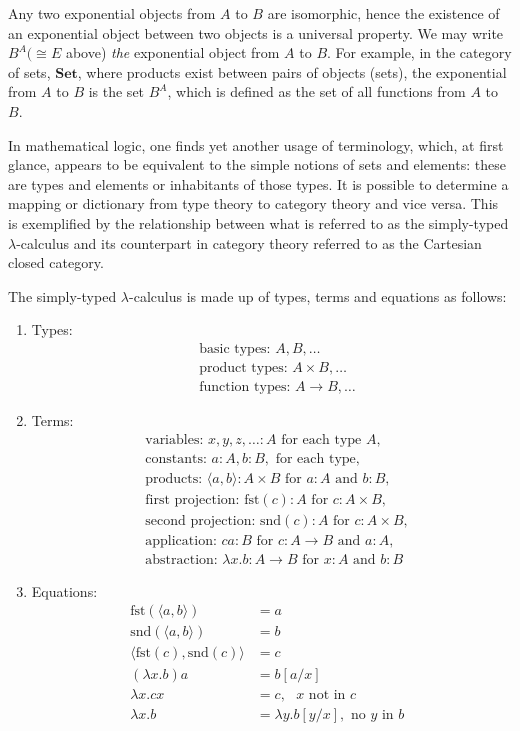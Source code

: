 \documentclass[10pt]{article}
\theoremstyle{plain}
\theoremstyle{definition}
\theoremstyle{remark}
\begin{document}
Any two exponential objects from $A$ to $B$ are isomorphic, hence the existence of an exponential object between two objects is a universal property.  We may write $B^A (\cong E$ above) \emph{the} exponential object from $A$ to $B$.
\vskip 1mm
For example, in the category of sets, $\textbf{Set}$, where products exist between pairs of objects (sets), the exponential from $A$ to $B$ is the set $B^A$, which is defined as the set of all functions from $A$ to $B$.

In mathematical logic, one finds yet another usage of terminology, which, at first glance, appears to be equivalent to the simple notions of sets and elements: these are types and elements or inhabitants of those types. It is possible to determine a mapping or dictionary from type theory to category theory and vice versa. This is exemplified by the relationship between what is referred to as the simply-typed $\lambda$-calculus and its counterpart in category theory referred to as the Cartesian closed category.

The simply-typed $\lambda$-calculus is made up of types, terms and equations as follows:
\begin{enumerate}
\item{Types:}
\begin{align*}
&\mbox{basic types: } A, B, \ldots\\
&\mbox{product types: } A \times B, \ldots\\
&\mbox{function types: } A \rightarrow B, \ldots
\end{align*}
\item{Terms:}
\begin{align*}
&\mbox{variables: } x, y, z, \ldots \colon A \mbox{ for each type } A,\\
&\mbox{constants: } a \colon A, b \colon B, \mbox{ for each type},\\
&\mbox{products: }\langle a, b \rangle \colon A \times B \mbox{ for } a:A \mbox{ and } b:B,\\
&\mbox{first projection: }\mbox{fst}(c) \colon A \mbox{ for } c \colon A \times B,\\
&\mbox{second projection: }\mbox{snd}(c) \colon A \mbox{ for } c \colon A \times B,\\
&\mbox{application: }ca \colon B \mbox{ for } c \colon A \rightarrow B \mbox{ and } a \colon A,\\
&\mbox{abstraction: }\lambda x. b \colon A \rightarrow B \mbox{ for } x \colon A \mbox{ and } b \colon B
\end{align*}
\item{Equations:}
\begin{align*}
            \mbox{fst}(\langle a, b \rangle) &= a\\
            \mbox{snd}(\langle a, b \rangle) &= b\\
            \langle \mbox{fst}(c), \mbox{snd}(c) \rangle &= c\\
            (\lambda x.b)a &= b[a/x]\\
            \lambda x.cx &= c, \mbox{ $x$ not in $c$ }\\
            \lambda x.b &= \lambda y.b [y/x], \mbox{ no $y$ in $b$ }
\end{align*}
\end{enumerate}
\end{document}
